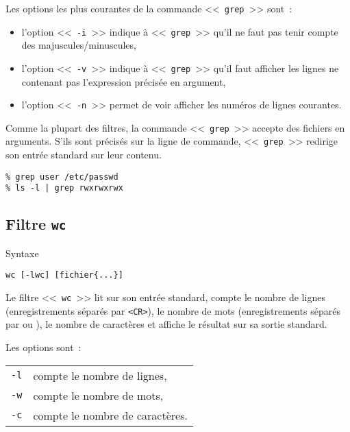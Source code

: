 Les options les plus courantes de la commande <<~{\tt grep}~>> sont~:
\begin{itemize}
	\item l'option <<~{\tt -i}~>> indique {\`a} <<~{\tt grep}~>> qu'il ne faut pas
		  tenir compte des majuscules/minuscules,
	\item l'option <<~{\tt -v}~>> indique {\`a} <<~{\tt grep}~>> qu'il faut afficher
		  les lignes ne contenant pas l'expression pr{\'e}cis{\'e}e en argument,
	\item l'option <<~{\tt -n}~>> permet de voir afficher les num{\'e}ros de
		  lignes courantes.
\end{itemize}

Comme la plupart des filtres, la commande <<~{\tt grep}~>> accepte des
fichiers en arguments. S'ils sont pr{\'e}cis{\'e}s sur la ligne de commande,
<<~{\tt grep}~>> redirige son entr{\'e}e standard sur leur contenu.

\begin{example}
\begin{verbatim}
% grep user /etc/passwd
% ls -l | grep rwxrwxrwx
\end{verbatim}
\end{example}

\subsection{\texorpdfstring{Filtre {\tt wc}}{Filtre wc}}

\begin{definition}{Syntaxe}
\begin{verbatim}
wc [-lwc] [fichier{...}]
\end{verbatim}
\end{definition}

Le filtre <<~{\tt wc}~>> lit sur son entr{\'e}e standard,  compte le nombre
de lignes (enregistrements s{\'e}par{\'e}s par \verb=<CR>=), le nombre de mots
(enregistrements s{\'e}par{\'e}s par \spacekey ou \tabkey), le nombre de
caract{\`e}res et affiche le r{\'e}sultat sur sa sortie standard.

Les options sont~:\\
\begin{tabular}{l@{\hspace{0.5cm}}l}
	{\tt -l}	&	compte le nombre de lignes,\\
	{\tt -w}	&	compte le nombre de mots,\\
	{\tt -c}	&	compte le nombre de caract{\`e}res.
\end{tabular}

